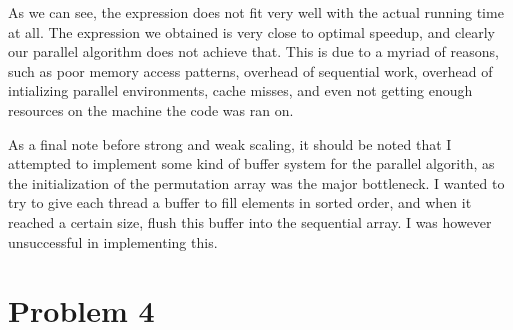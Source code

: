 \documentclass{article}
\begin{document}
As we can see, the expression does not fit very well with the actual running time at all. The expression we obtained is very close to optimal speedup, and clearly our parallel algorithm does not achieve that. This is due to a myriad of reasons, such as poor memory access patterns, overhead of sequential work, overhead of intializing parallel environments, cache misses, and even not getting enough resources on the machine the code was ran on.
\medskip

As a final note before strong and weak scaling, it should be noted that I attempted to implement some kind of buffer system for the parallel algorith, as the initialization of the permutation array was the major bottleneck. I wanted to try to give each thread a buffer to fill elements in sorted order, and when it reached a certain size, flush this buffer into the sequential array. I was however unsuccessful in implementing this.


\section*{Problem 4}
\end{document}
